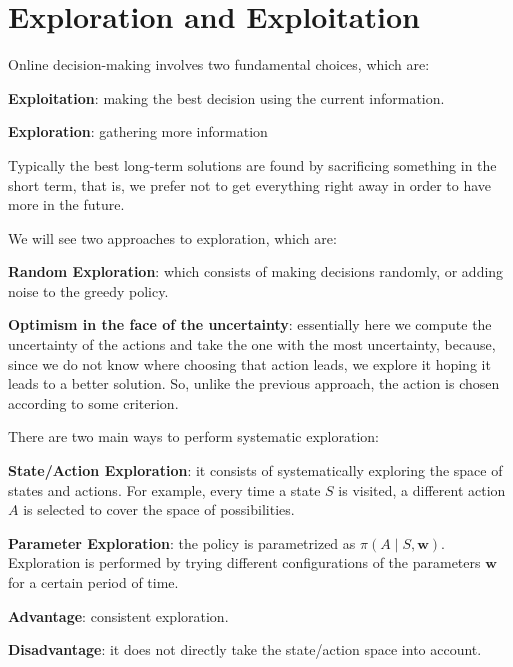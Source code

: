 \chapter{Exploration and Exploitation}
Online decision-making involves two fundamental choices, which are:
\begin{compactitemize}
    \item \textbf{Exploitation}: making the best decision using the current information.
    \item \textbf{Exploration}: gathering more information
\end{compactitemize}
Typically the best long-term solutions are found by sacrificing something in the short term, that is, we prefer not to get everything right away in order to have more in the future.

We will see two approaches to exploration, which are:
\begin{compactitemize}
    \item \textbf{Random Exploration}: which consists of making decisions randomly, or adding noise to the greedy policy.
    \item \textbf{Optimism in the face of the uncertainty}: essentially here we compute the uncertainty of the actions and take the one with the most uncertainty, because, since we do not know where choosing that action leads, we explore it hoping it leads to a better solution. So, unlike the previous approach, the action is chosen according to some criterion.
\end{compactitemize}

There are two main ways to perform systematic exploration:

\begin{compactitemize}
    \item \textbf{State/Action Exploration}: it consists of systematically exploring the space of states and actions.
    For example, every time a state $S$ is visited, a different action $A$ is selected to cover the space of possibilities.

    \item \textbf{Parameter Exploration}: the policy is parametrized as $\pi(A \mid S, \mathbf{w})$.
    Exploration is performed by trying different configurations of the parameters $\mathbf{w}$ for a certain period of time.
    \begin{compactitemize}
        \item \textbf{Advantage}: consistent exploration.
        \item \textbf{Disadvantage}: it does not directly take the state/action space into account.
    \end{compactitemize}
\end{compactitemize}

